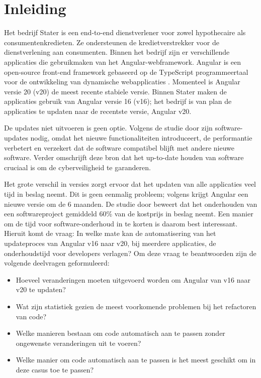 
\section{Inleiding}
\label{sec:inleiding}

Het bedrijf Stater is een end-to-end dienstverlener voor zowel hypothecaire als consumentenkredieten.
Ze ondersteunen de kredietverstrekker voor de dienstverlening aan consumenten.
Binnen het bedrijf zijn er verschillende applicaties die gebruikmaken van het Angular-webframework.
Angular is een open-source front-end framework gebaseerd op de TypeScript programmeertaal voor de ontwikkeling van dynamische webapplicaties \autocite{Cincovic2019}.
Momenteel is Angular versie 20 (v20) de meest recente stabiele versie.
Binnen Stater maken de applicaties gebruik van Angular versie 16 (v16); het bedrijf is van plan de applicaties te updaten naar de recentste versie, Angular v20.

De updates niet uitvoeren is geen optie.
Volgens de studie door \textcite{Vaniea2016} zijn software-updates nodig, omdat het nieuwe functionaliteiten introduceert, de performantie verbetert en verzekert dat de software compatibel blijft met andere nieuwe software.
Verder omschrijft deze bron dat het up-to-date houden van software cruciaal is om de cyberveiligheid te garanderen.

Het grote verschil in versies zorgt ervoor dat het updaten van alle applicaties veel tijd in beslag neemt.
Dit is geen eenmalig probleem; volgens \textcite{Callaghan2023} krijgt Angular een nieuwe versie om de 6 maanden.
De studie door \textcite{Kaur2015} beweert dat het onderhouden van een softwareproject gemiddeld 60\% van de kostprijs in beslag neemt.
Een manier om de tijd voor software-onderhoud in te korten is daarom best interessant.
Hieruit komt de vraag: In welke mate kan de automatisering van het updateproces van Angular v16 naar v20, bij meerdere applicaties, de onderhoudstijd voor developers verlagen?
Om deze vraag te beantwoorden zijn de volgende deelvragen geformuleerd:
\begin{itemize}
  \item Hoeveel veranderingen moeten uitgevoerd worden om Angular van v16 naar v20 te updaten? 
  \item Wat zijn statistiek gezien de meest voorkomende problemen bij het refactoren van code? 
  \item Welke manieren bestaan om code automatisch aan te passen zonder ongewenste veranderingen uit te voeren? 
  \item Welke manier om code automatisch aan te passen is het meest geschikt om in deze casus toe te passen?
\end{itemize}

